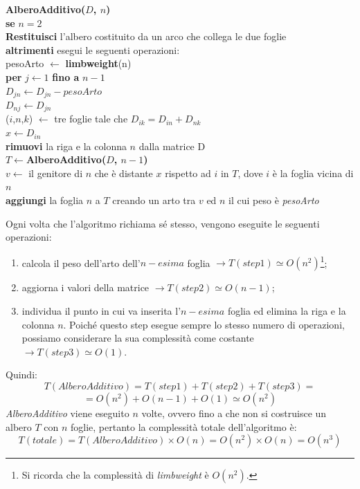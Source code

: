 \begin{framed}\noindent
  \textbf{AlberoAdditivo($D$, $n$)}\\
  \textbf{se} $n=2$\\
  \indent \textbf{Restituisci} l'albero costituito da un arco che collega le due foglie\\
  \textbf{altrimenti} esegui le seguenti operazioni: \\
  pesoArto $\leftarrow$ \textbf{limbweight}(n)\\
  \textbf{per} $j \leftarrow 1$ \textbf{fino a} $n-1$\\
  \indent $D_{jn} \leftarrow D_{jn} - pesoArto$\\
  \indent $D_{nj} \leftarrow D_{jn}$\\
  ($i$,$n$,$k$) $\leftarrow$ tre foglie tale che $D_{ik}=D_{in}+D_{nk}$\\
  $x \leftarrow D_{in}$\\
  \textbf{rimuovi} la riga e la colonna $n$ dalla matrice D \\
  $T \leftarrow $\textbf{AlberoAdditivo($D$, $n-1$)}\\
  $v \leftarrow $ il genitore di $n$ che è distante $x$ rispetto ad $i$ in $T$, dove $i$ è la foglia vicina di $n$\\
  \textbf{aggiungi} la foglia $n$ a $T$ creando un arto tra $v$ ed $n$ il cui peso è \textit{pesoArto}
\end{framed}
Ogni volta che l'algoritmo richiama sé stesso, vengono eseguite le seguenti operazioni:
\begin{enumerate}
	\item calcola il peso dell'arto dell'$n-esima$ foglia $\rightarrow T(step 1) \simeq O(n^2)$\footnote{Si ricorda che la complessità di \textit{limbweight} è $O(n^2)$.};
	\item aggiorna i valori della matrice $\rightarrow T(step 2) \simeq O(n-1)$;
	\item individua il punto in cui va inserita l'$n-esima$ foglia ed elimina la riga e la colonna $n$. Poiché questo step esegue sempre lo stesso numero di operazioni, possiamo considerare la sua complessità come costante $\rightarrow  T(step 3) \simeq O(1)$.  
\end{enumerate} 
Quindi:
\[T(AlberoAdditivo)=T(step 1)+T(step 2)+T(step 3)=\]
\[=O(n^2)+O(n-1)+O(1) \simeq O(n^2)\]
\textit{AlberoAdditivo} viene eseguito $n$ volte, ovvero fino a che non si costruisce un albero $T$ con $n$ foglie, pertanto la complessità totale dell'algoritmo è:
\[T(totale)=T(AlberoAdditivo) \times O(n)=O(n^2) \times O(n)= O(n^3)\]

